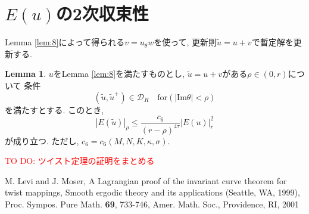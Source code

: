 \documentclass[a4paper]{ujarticle}
\newcommand{\red}[1]{\textcolor{red}{#1}} %
\numberwithin{equation}{section}
\theoremstyle{definition}
\newtheorem{lemma}{Lemma}
\begin{document}
        \section{$E(u)$の2次収束性}
        Lemma \ref{lem:8}によって得られる$v = u_{\theta} w$を使って,
        更新則$\tilde{u} = u + v$で暫定解を更新する.
        \begin{lemma}
            $u$をLemma \ref{lem:8}を満たすものとし, $\tilde{u} = u + v$がある$\rho \in (0, r)$について
            条件
            \begin{equation} 
                (\tilde{u}, \tilde{u}^{+}) \in \mathcal{D}_{R} \quad \text{for} (|\mathrm{Im} \theta| < \rho)
            \end{equation}
            を満たすとする. このとき,
            \begin{equation} \label{eq:29}
                |E(\tilde{u})|_{\rho} \leq \frac{c_6}{(r - \rho)^{4 \tau}} |E(u)|^2_{r}
            \end{equation}
            が成り立つ. ただし, $c_6 = c_6(M, N, K, \kappa, \sigma)$.
        \end{lemma}
        \red{TO DO: ツイスト定理の証明をまとめる}
    \begin{thebibliography}{10}
    \nocite{*}
	  M. Levi and J. Moser, A Lagrangian proof of the invariant curve theorem for twist mappings, 
    Smooth ergodic theory and its applications (Seattle, WA, 1999), Proc. Sympos. Pure Math. \textbf{69}, 733-746, Amer. Math. Soc., Providence, RI, 2001 
\end{thebibliography}
\end{document}
